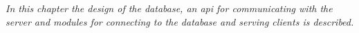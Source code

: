 \emph{In this chapter the design of the database, an \ac{api} for communicating with the server and modules for connecting to the database and serving clients is described.}
